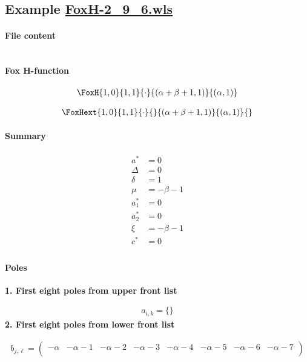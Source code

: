 \documentclass[preview]{standalone}
\begin{document}
\subsection{Example \url{FoxH-2_9_6.wls}}

\paragraph{File content}

\inputminted{text}{../Examples/FoxH-2_9_6.wls}

\paragraph{Fox H-function}

\begin{align*}
  \FoxH
    {1,0}
    {1,1}
    {\cdot}
    {\left(\alpha +\beta +1, 1\right)}
    {\left(\alpha, 1\right)}
\end{align*}

\begin{align*}
  \FoxHext
    {1,0}
    {1,1}
    {\cdot}
    {}
    {\left(\alpha +\beta +1, 1\right)}
    {\left(\alpha, 1\right)}
    {}
\end{align*}

\paragraph{Summary}

\begin{align*}
  a^*    & = 0 \\
  \Delta & = 0 \\
  \delta & = 1 \\
  \mu    & = -\beta -1 \\
  a_1^*  & = 0 \\
  a_2^*  & = 0 \\
  \xi    & = -\beta -1 \\
  c^*    & = 0 \\
\end{align*}

\paragraph{Poles}

\noindent\textbf{1. First eight poles from upper front list}

\begin{align*}
  a_{i,k} = 
  \{\}
\end{align*}
\noindent\textbf{2. First eight poles from lower front list}

\begin{align*}
  b_{j,\ell} = 
  \left(
\begin{array}{cccccccc}
 -\alpha  & -\alpha -1 & -\alpha -2 & -\alpha -3 & -\alpha -4 & -\alpha -5 & -\alpha -6 & -\alpha -7 \\
\end{array}
\right)
\end{align*}
\end{document}
